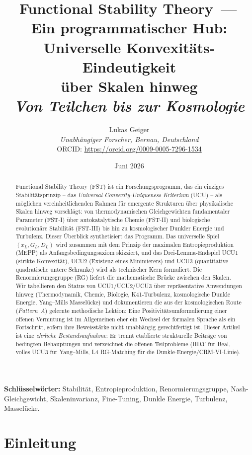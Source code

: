 \documentclass[11pt,a4paper]{article}
\title{Functional Stability Theory \,---\,\\
Ein programmatischer Hub:\\
Universelle Konvexitäts-Eindeutigkeit\\
über Skalen hinweg\\[0.5em]
\large\textit{Von Teilchen bis zur Kosmologie}}
\author{Lukas Geiger\\
\textit{Unabhängiger Forscher, Bernau, Deutschland}\\
ORCID: \url{https://orcid.org/0009-0005-7296-1534}}
\date{Juni 2026}
\theoremstyle{remark}
\begin{document}
\maketitle

\begin{abstract}
\noindent
Functional Stability Theory (FST) ist ein Forschungsprogramm, das ein einziges Stabilitätsprinzip -- das \emph{Universal Convexity-Uniqueness Kriterium} (UCU) -- als möglichen vereinheitlichenden Rahmen für emergente Strukturen über physikalische Skalen hinweg vorschlägt: von thermodynamischen Gleichgewichten fundamentaler Parameter (FST-I) über autokatalytische Chemie (FST-II) und biologische evolutionäre Stabilität (FST-III) bis hin zu kosmologischer Dunkler Energie und Turbulenz. Dieser Überblick synthetisiert das Programm. Das universelle Spiel $(x_L, G_L, D_L)$ wird zusammen mit dem Prinzip der maximalen Entropieproduktion (MEPP) als Anfangsbedingungsaxiom skizziert, und das Drei-Lemma-Endspiel UCU1 (strikte Konvexität), UCU2 (Existenz eines Minimierers) und UCU3 (quantitative quadratische untere Schranke) wird als technischer Kern formuliert. Die Renormierungsgruppe (RG) liefert die mathematische Brücke zwischen den Skalen. Wir tabellieren den Status von UCU1/UCU2/UCU3 über repräsentative Anwendungen hinweg (Thermodynamik, Chemie, Biologie, K41-Turbulenz, kosmologische Dunkle Energie, Yang--Mills Masselücke) und dokumentieren die aus der kosmologischen Route (\emph{Pattern~A}) gelernte methodische Lektion: Eine Positivitätsumformulierung einer offenen Vermutung ist im Allgemeinen eher ein Wechsel der formalen Sprache als ein Fortschritt, sofern ihre Beweisstärke nicht unabhängig gerechtfertigt ist. Dieser Artikel ist eine \emph{ehrliche Bestandsaufnahme}: Er trennt etablierte strukturelle Beiträge von bedingten Behauptungen und verzeichnet die offenen Teilprobleme (HD3' für Beal, volles UCU3 für Yang--Mills, L4 RG-Matching für die Dunkle-Energie/CRM-VI-Linie).
\end{abstract}

\textbf{Schlüsselwörter:} Stabilität, Entropieproduktion, Renormierungsgruppe,
Nash-Gleichgewicht, Skaleninvarianz, Fine-Tuning, Dunkle Energie,
Turbulenz, Masselücke.

\clearpage

\section{Einleitung}
\label{sec:intro}
\end{document}

